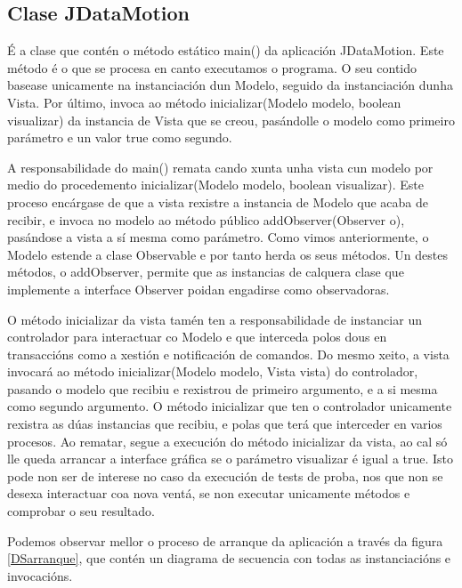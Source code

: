 \subsection{Clase JDataMotion}

É a clase que contén o método estático main() da aplicación JDataMotion. Este método é o que se procesa en canto executamos o programa. O seu contido basease unicamente na instanciación dun Modelo, seguido da instanciación dunha Vista. Por último, invoca ao método inicializar(Modelo modelo, boolean visualizar) da instancia de Vista que se creou, pasándolle o modelo como primeiro parámetro e un valor true como segundo.

A responsabilidade do main() remata cando xunta unha vista cun modelo por medio do procedemento inicializar(Modelo modelo, boolean visualizar). Este proceso encárgase de que a vista rexistre a instancia de Modelo que acaba de recibir, e invoca no modelo ao método público addObserver(Observer o), pasándose a vista a sí mesma como parámetro. Como vimos anteriormente, o Modelo estende a clase Observable e por tanto herda os seus métodos. Un destes métodos, o addObserver, permite que as instancias de calquera clase que implemente a interface Observer poidan engadirse como observadoras.

O método inicializar da vista tamén ten a responsabilidade de instanciar un controlador para interactuar co Modelo e que interceda polos dous en transaccións como a xestión e notificación de comandos. Do mesmo xeito, a vista invocará ao método inicializar(Modelo modelo, Vista vista) do controlador, pasando o modelo que recibiu e rexistrou de primeiro argumento, e a si mesma como segundo argumento. O método inicializar que ten o controlador unicamente rexistra as dúas instancias que recibiu, e polas que terá que interceder en varios procesos. Ao rematar, segue a execución do método inicializar da vista, ao cal só lle queda arrancar a interface gráfica se o parámetro visualizar é igual a true. Isto pode non ser de interese no caso da execución de tests de proba, nos que non se desexa interactuar coa nova ventá, se non executar unicamente métodos e comprobar o seu resultado.

Podemos observar mellor o proceso de arranque da aplicación a través da figura \ref{DSarranque}, que contén un diagrama de secuencia con todas as instanciacións e invocacións.

